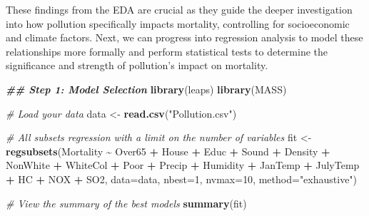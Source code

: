 \documentclass[
]{article}
\newenvironment{Shaded}{\begin{snugshade}}{\end{snugshade}}
\newcommand{\AttributeTok}[1]{\textcolor[rgb]{0.13,0.29,0.53}{#1}}
\newcommand{\CommentTok}[1]{\textcolor[rgb]{0.56,0.35,0.01}{\textit{#1}}}
\newcommand{\DecValTok}[1]{\textcolor[rgb]{0.00,0.00,0.81}{#1}}
\newcommand{\DocumentationTok}[1]{\textcolor[rgb]{0.56,0.35,0.01}{\textbf{\textit{#1}}}}
\newcommand{\FunctionTok}[1]{\textcolor[rgb]{0.13,0.29,0.53}{\textbf{#1}}}
\newcommand{\NormalTok}[1]{#1}
\newcommand{\OtherTok}[1]{\textcolor[rgb]{0.56,0.35,0.01}{#1}}
\newcommand{\SpecialCharTok}[1]{\textcolor[rgb]{0.81,0.36,0.00}{\textbf{#1}}}
\newcommand{\StringTok}[1]{\textcolor[rgb]{0.31,0.60,0.02}{#1}}
\begin{document}
These findings from the EDA are crucial as they guide the deeper
investigation into how pollution specifically impacts mortality,
controlling for socioeconomic and climate factors. Next, we can progress
into regression analysis to model these relationships more formally and
perform statistical tests to determine the significance and strength of
pollution's impact on mortality.

\begin{Shaded}
\begin{Highlighting}[]
\DocumentationTok{\#\# Step 1: Model Selection}
\FunctionTok{library}\NormalTok{(leaps)}
\FunctionTok{library}\NormalTok{(MASS)}

\CommentTok{\# Load your data}
\NormalTok{data }\OtherTok{\textless{}{-}} \FunctionTok{read.csv}\NormalTok{(}\StringTok{"Pollution.csv"}\NormalTok{)}

\CommentTok{\# All subsets regression with a limit on the number of variables}
\NormalTok{fit }\OtherTok{\textless{}{-}} \FunctionTok{regsubsets}\NormalTok{(Mortality }\SpecialCharTok{\textasciitilde{}}\NormalTok{ Over65 }\SpecialCharTok{+}\NormalTok{ House }\SpecialCharTok{+}\NormalTok{ Educ }\SpecialCharTok{+}\NormalTok{ Sound }\SpecialCharTok{+}\NormalTok{ Density }\SpecialCharTok{+}\NormalTok{ NonWhite }\SpecialCharTok{+}\NormalTok{ WhiteCol }\SpecialCharTok{+}\NormalTok{ Poor }\SpecialCharTok{+}\NormalTok{ Precip }\SpecialCharTok{+}\NormalTok{ Humidity }\SpecialCharTok{+}\NormalTok{ JanTemp }\SpecialCharTok{+}\NormalTok{ JulyTemp }\SpecialCharTok{+}\NormalTok{ HC }\SpecialCharTok{+}\NormalTok{ NOX }\SpecialCharTok{+}\NormalTok{ SO2, }\AttributeTok{data=}\NormalTok{data, }\AttributeTok{nbest=}\DecValTok{1}\NormalTok{, }\AttributeTok{nvmax=}\DecValTok{10}\NormalTok{, }\AttributeTok{method=}\StringTok{"exhaustive"}\NormalTok{)}

\CommentTok{\# View the summary of the best models}
\FunctionTok{summary}\NormalTok{(fit)}
\end{Highlighting}
\end{Shaded}
\end{document}
